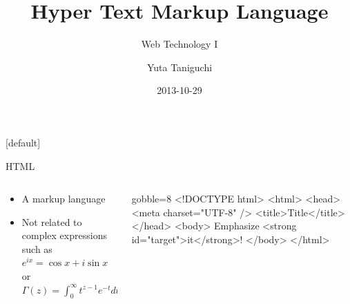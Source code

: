 \documentclass[14pt]{beamer}
\title{Hyper Text Markup Language}
\subtitle{Web Technology I}
\author{Yuta Taniguchi}
\institute{@yuttieyuttie}
\date{2013-10-29}
\begin{document}
{%
  [default]
  \frame{\titlepage}
}
\setcounter{framenumber}{0}


\begin{frame}[fragile]{HTML}
  \begin{columns}
    \begin{column}{0.4\textwidth}
      \begin{itemize}
        \item A markup language
        \item Not related to complex expressions such as
          $e^{ix} = \cos x + i \sin x$ or
          $\Gamma(z) = \int_0^\infty t^{z-1} e^{-t} dt$
      \end{itemize}
    \end{column}
    \begin{column}{0.6\textwidth}
      \begin{html*}{gobble=8}
        <!DOCTYPE html>
        <html>
          <head>
            <meta charset="UTF-8" />
            <title>Title</title>
          </head>
          <body>
            Emphasize
            <strong id="target">it</strong>!
          </body>
        </html>
      \end{html*}
    \end{column}
  \end{columns}
\end{frame}
\end{document}
